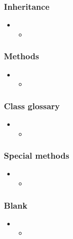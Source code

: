 \begin{frame}[fragile]
%
  \frametitle{Inheritance}
%
  \begin{itemize}
%
  \item 
    \begin{itemize}
    \item
    \end{itemize}
%
  \end{itemize}
%
\end{frame}

\begin{frame}[fragile]
%
  \frametitle{Methods}
%
  \begin{itemize}
%
  \item 
    \begin{itemize}
    \item
    \end{itemize}
%
  \end{itemize}
%
\end{frame}

\begin{frame}[fragile]
%
  \frametitle{Class glossary}
%
  \begin{itemize}
%
  \item 
    \begin{itemize}
    \item
    \end{itemize}
%
  \end{itemize}
%
\end{frame}

\begin{frame}[fragile]
%
  \frametitle{Special methods}
%
  \begin{itemize}
%
  \item 
    \begin{itemize}
    \item
    \end{itemize}
%
  \end{itemize}
%
\end{frame}

\begin{frame}[fragile]
%
  \frametitle{Blank}
%
  \begin{itemize}
%
  \item 
    \begin{itemize}
    \item
    \end{itemize}
%
  \end{itemize}
%
\end{frame}

